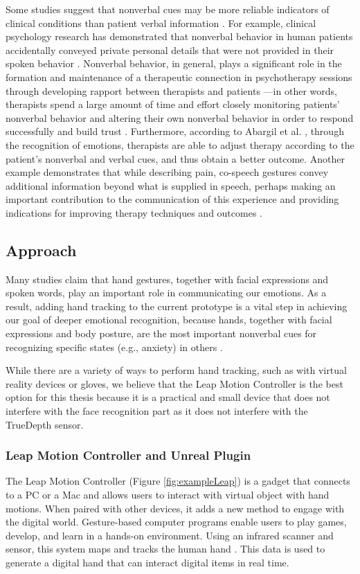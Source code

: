 Some studies suggest that nonverbal cues may be more reliable indicators of clinical conditions than patient verbal information \cite{KNA13}. For example, clinical psychology research has demonstrated that nonverbal behavior in human patients accidentally conveyed private personal details that were not provided in their spoken behavior \cite{FAB06, KLE03}. Nonverbal behavior, in general, plays a significant role in the formation and maintenance of a therapeutic connection in psychotherapy sessions through developing rapport between therapists and patients \cite{KLE03}—in other words, therapists spend a large amount of time and effort closely monitoring patients' nonverbal behavior and altering their own nonverbal behavior in order to respond successfully and build trust \cite{ABA21}. Furthermore, according to Abargil et al. \cite{ABA21}, through the recognition of emotions, therapists are able to adjust therapy according to the patient's nonverbal and verbal cues, and thus obtain a better outcome. Another example demonstrates that while describing pain, co-speech gestures convey additional information beyond what is supplied in speech, perhaps making an important contribution to the communication of this experience and providing indications for improving therapy techniques and outcomes \cite{ROW16, REI22}.

\subsection{Approach}
Many studies claim that hand gestures, together with facial expressions and spoken words, play an important role in communicating our emotions. As a result, adding hand tracking to the current prototype is a vital step in achieving our goal of deeper emotional recognition, because hands, together with facial expressions and body posture, are the most important nonverbal cues for recognizing specific states (e.g., anxiety) in others \cite{WAX97, REI22}.

While there are a variety of ways to perform hand tracking, such as with virtual reality devices or gloves, we believe that the Leap Motion Controller is the best option for this thesis because it is a practical and small device that does not interfere with the face recognition part as it does not interfere with the TrueDepth sensor.

\subsubsection{Leap Motion Controller and Unreal Plugin}
The Leap Motion Controller (Figure \ref{fig:exampleLeap}) is a gadget that connects to a PC or a Mac and allows users to interact with virtual object with hand motions. When paired with other devices, it adds a new method to engage with the digital world. Gesture-based computer programs enable users to play games, develop, and learn in a hands-on environment. Using an infrared scanner and sensor, this system maps and tracks the human hand \cite{LEAPROD}. This data is used to generate a digital hand that can interact digital items in real time.

